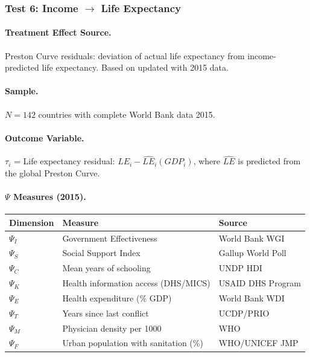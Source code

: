 \subsubsection{Test 6: Income $\rightarrow$ Life Expectancy}

\paragraph{Treatment Effect Source.}
Preston Curve residuals: deviation of actual life expectancy from income-predicted life expectancy. Based on \citet{preston1975changing} updated with 2015 data.

\paragraph{Sample.}
$N = 142$ countries with complete World Bank data 2015.

\paragraph{Outcome Variable.}
$\tau_i$ = Life expectancy residual: $LE_i - \hat{LE}_i(GDP_i)$, where $\hat{LE}$ is predicted from the global Preston Curve.

\paragraph{$\Psi$ Measures (2015).}
\begin{center}
\small
\begin{tabular}{@{}lll@{}}
\toprule
\textbf{Dimension} & \textbf{Measure} & \textbf{Source} \\
\midrule
$\Psi_I$ & Government Effectiveness & World Bank WGI \\
$\Psi_S$ & Social Support Index & Gallup World Poll \\
$\Psi_C$ & Mean years of schooling & UNDP HDI \\
$\Psi_K$ & Health information access (DHS/MICS) & USAID DHS Program \\
$\Psi_E$ & Health expenditure (\% GDP) & World Bank WDI \\
$\Psi_T$ & Years since last conflict & UCDP/PRIO \\
$\Psi_M$ & Physician density per 1000 & WHO \\
$\Psi_F$ & Urban population with sanitation (\%) & WHO/UNICEF JMP \\
\bottomrule
\end{tabular}
\end{center}

